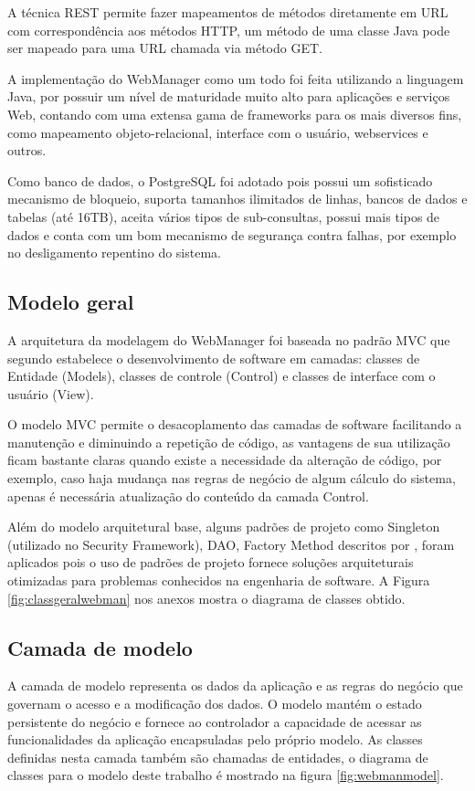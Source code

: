 A técnica REST permite fazer mapeamentos de métodos diretamente em URL com correspondência aos métodos HTTP, um método de uma classe Java pode ser mapeado para uma URL chamada via método GET.

A implementação do WebManager como um todo foi feita utilizando a linguagem Java, por possuir um nível de maturidade muito alto para aplicações e serviços Web, contando com uma extensa gama de frameworks para os mais diversos fins, como mapeamento objeto-relacional, interface com o usuário,  webservices e outros.

Como banco de dados, o PostgreSQL foi adotado  pois possui um sofisticado mecanismo de bloqueio, suporta tamanhos ilimitados de linhas, bancos de dados e tabelas (até 16TB), aceita vários tipos de sub-consultas, possui mais tipos de dados e conta com um bom mecanismo de segurança contra falhas, por exemplo no desligamento repentino do sistema.

\subsection{Modelo geral}

A arquitetura da modelagem do WebManager foi baseada no padrão MVC que segundo \textcite{Mendes:2002} estabelece o desenvolvimento de software em camadas: classes de Entidade (Models), classes de controle (Control) e classes de interface com o usuário (View). 

O modelo MVC permite o desacoplamento das camadas de software facilitando a manutenção e diminuindo a repetição de código, as vantagens de sua utilização ficam bastante claras quando existe a necessidade da alteração de código, por exemplo, caso haja mudança nas regras de negócio de algum cálculo do sistema, apenas é necessária atualização do conteúdo da camada Control.

Além do modelo arquitetural base, alguns padrões de projeto como Singleton (utilizado no Security Framework), DAO, Factory Method descritos por \textcite{Gamma:2000}, foram aplicados pois o uso de padrões de projeto fornece soluções arquiteturais otimizadas para problemas conhecidos na engenharia de software. A Figura \ref{fig:classgeralwebman} nos anexos mostra o diagrama de classes obtido.

\subsection{Camada de modelo}

A camada de modelo representa os dados da aplicação e as regras do negócio que governam o acesso e a modificação dos dados. O modelo mantém o estado persistente do negócio e fornece ao controlador a capacidade de acessar as funcionalidades da aplicação encapsuladas pelo próprio modelo. As classes definidas nesta camada também são chamadas de entidades, o diagrama de classes para o modelo deste trabalho é mostrado na figura \ref{fig:webmanmodel}.

